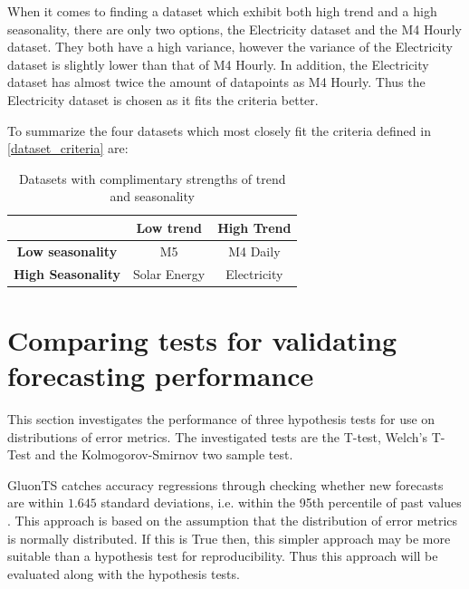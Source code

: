 When it comes to finding a dataset which exhibit both high trend and a high seasonality, there are only two options, the Electricity dataset and the M4 Hourly dataset. They both have a high variance, however the variance of the Electricity dataset is slightly lower than that of M4 Hourly. In addition, the Electricity dataset has almost twice the amount of datapoints as M4 Hourly. Thus the Electricity dataset is chosen as it fits the criteria better.


To summarize the four datasets which most closely fit the criteria defined in \ref{dataset_criteria} are:

\begin{table}[htp]
  \centering
  \begin{tabular}{ccc}
                              & \textbf{Low trend} & \textbf{High Trend} \\
    \hline
    \textbf{Low seasonality}  & M5                 & M4 Daily            \\
    \hline
    \textbf{High Seasonality} & Solar Energy       & Electricity         \\
  \end{tabular}
  \caption{Datasets with complimentary strengths of trend and seasonality}
  \label{fig:representative_subset_of_datasets}
\end{table}

\section{Comparing tests for validating forecasting performance}
\label{sec:compairing_hypothesis_tests}
This section investigates the performance of three hypothesis tests for use on distributions of error metrics. The investigated tests are the T-test, Welch’s T-Test and the Kolmogorov-Smirnov two sample test.

GluonTS catches accuracy regressions through checking whether new forecasts are within \(1.645\) standard deviations, i.e. within the 95th percentile of past values \cite{gluonts-github}. This approach is based on the assumption that the distribution of error metrics is normally distributed. If this is True then, this simpler approach may be more suitable than a hypothesis test for reproducibility. Thus this approach will be evaluated along with the hypothesis tests.


